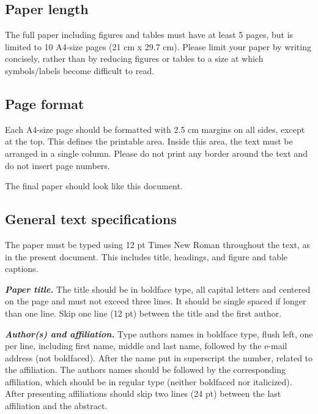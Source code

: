 \documentclass[12pt,fleqn]{article}
\begin{document}
\newpage %
\subsection{Paper length}
The full paper including figures and tables must have at least 5 pages, but is limited to 10 A4-size pages (21 cm x 29.7 cm). Please limit your paper by writing concisely, rather than by reducing figures or tables to a size at which symbols/labels become difficult to read.

\subsection{Page format}
Each A4-size page should be formatted with 2.5 cm margins on all sides, except at the top. This defines the printable area. Inside this area, the text must be arranged in a single column. Please do not print any border around the text and do not insert page numbers.

The final paper should look like this document.

\subsection{General text specifications}

The paper must be typed using 12 pt Times New Roman throughout the text, as in the present document. This includes title, headings, and figure and table captions.

\vspace{0.5cm} %

\textbf{\textit{Paper title.}} The title should be in boldface type, all capital letters and centered on the page and must not exceed three lines. It should be single spaced if longer than one line. Skip one line (12 pt) between the title and the first author.

\vspace{0.5cm} %

\textbf{\textit{Author(s) and affiliation.}} Type authors names in boldface type, flush left, one per line, including first name, middle and last name, followed by the e-mail address (not boldfaced). After the name put in superscript the number, related to the affiliation. The authors names should be followed by the corresponding affiliation, which should be in regular type (neither boldfaced nor italicized). After presenting affiliations should skip two lines (24 pt) between the last affiliation and the abstract.
\end{document}
